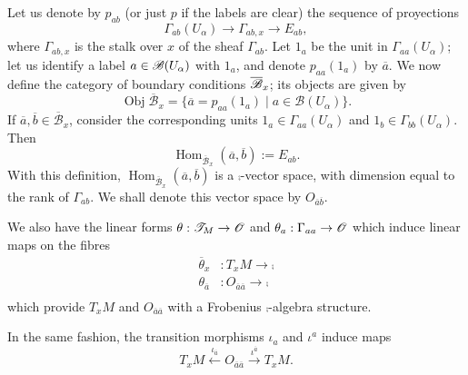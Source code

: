 Let us denote by $p_{ab}$ (or just $p$ if the labels are clear) the sequence of proyections
\begin{equation}\label{proy}
\Gamma_{ab}(U_\alpha )\longrightarrow \Gamma_{ab,x}\longrightarrow E_{ab},
\end{equation}
where $\Gamma_{ab,x}$ is the stalk over $x$ of the sheaf $\Gamma_{ab}$. Let $1_a$ be the unit in $\Gamma_{aa}(U_\alpha )$; let us identify a label $a\in \mathscr{B}(U_\alpha )$ with $1_a$, and denote $p_{aa}(1_a)$ by $\overline{a}$. We now define the category of boundary conditions $\overline{\mathscr{B}}_x$; its objects are given by
$$\operatorname{Obj}\overline{\mathscr{B}}_x=\{\overline{a}=p_{aa}(1_a) \; | \; a\in \mathscr{B}(U_\alpha )\}.$$
If $\overline{a},\overline{b}\in \overline{\mathscr{B}}_x$, consider the corresponding units $1_a\in \Gamma_{aa}(U_\alpha )$ and $1_b\in \Gamma_{bb}(U_\alpha )$. Then
$$\operatorname{Hom}_{\overline{\mathscr{B}}_x}(\overline{a},\overline{b}):=E_{ab}.$$
With this definition, $\operatorname{Hom}_{\overline{\mathscr{B}}_x}(\overline{a},\overline{b})$ is a $\comp$-vector space, with dimension equal to the rank of $\Gamma_{ab}$. We shall denote this vector space by $O_{\overline{a}\overline{b}}$.

We also have the linear forms $\theta :\mathscr{T}_M\to \mathscr{O}$ and $\theta_a:\Gamma_{aa}\to \mathscr{O}$ which induce linear maps on the fibres
$$
\begin{aligned}
\overline{\theta}_x &: T_xM\longrightarrow \comp \\
\theta_{\overline{a}} &: O_{\overline{a}\overline{a}}\longrightarrow \comp \\
\end{aligned}
$$
 which provide $T_xM$ and $O_{\overline{a}\overline{a}}$ with a Frobenius $\comp$-algebra structure.

In the same fashion, the transition morphisms $\iota_a$ and $\iota^a$ induce maps
$$T_xM\stackrel{\iota_{\overline{a}}}{\longleftarrow}O_{\overline{a}\overline{a}}\stackrel{\iota^{\overline{a}}}{\longrightarrow}T_xM.$$

